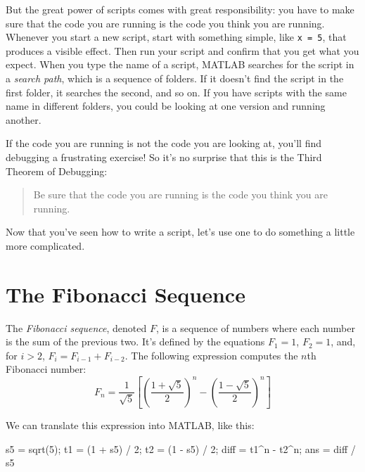 But the great power of scripts comes with great responsibility: you have to make sure that the code you are running is the code you think you are running.
Whenever you start a new script, start with something simple, like \lstinline{x = 5}, that produces a visible effect. Then run your script and confirm that you get what you expect.
When you type the name of a script, MATLAB searches for the script in a \emph{search path}, which is a sequence of folders.  If it doesn't find the script in the first folder, it searches the second, and so on.
If you have scripts with the same name in different folders, you could be looking at one version and running another.



If the code you are running is not the code you are looking
at, you'll find debugging a frustrating exercise!  So it's no surprise that this is the Third Theorem of Debugging:

\begin{quote}
Be sure that the code you are running
is the code you think you are running.
\end{quote}

Now that you've seen how to write a script, let's use one to do something a little more complicated.

\section{The Fibonacci Sequence}


The \emph{Fibonacci sequence}, denoted $F$, is a sequence of numbers where each number is the sum of the previous two.
It's defined by the equations $F_1 = 1$, $F_2 = 1$, and, for $i > 2$, $F_{i} = F_{i-1} + F_{i-2}$.
The following expression computes the $n$th Fibonacci number:
%
\begin{equation*}
F_n = \frac{1}{\sqrt{5}}
\left[
\left( \frac{1 + \sqrt{5}}{2} \right)^{n} -
\left( \frac{1 - \sqrt{5}}{2} \right)^{n}
\right]
\end{equation*}
%

We can translate this expression into MATLAB, like this:

\begin{code}
s5 = sqrt(5);
t1 = (1 + s5) / 2;
t2 = (1 - s5) / 2;
diff = t1^n - t2^n;
ans = diff / s5
\end{code}

